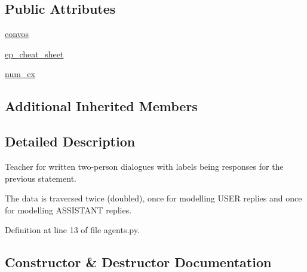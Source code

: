 \subsection*{Public Attributes}
\begin{DoxyCompactItemize}
\item 
\hyperlink{classparlai_1_1tasks_1_1taskmaster_1_1agents_1_1SelfDialogueTeacher_a6a5215f1c64623de6962a32b95f27fac}{convos}
\item 
\hyperlink{classparlai_1_1tasks_1_1taskmaster_1_1agents_1_1SelfDialogueTeacher_ac8110082f9ce0736ff129f93cf7740c1}{ep\+\_\+cheat\+\_\+sheet}
\item 
\hyperlink{classparlai_1_1tasks_1_1taskmaster_1_1agents_1_1SelfDialogueTeacher_a8a3fced952427353aba96b59a8efe0d2}{num\+\_\+ex}
\end{DoxyCompactItemize}
\subsection*{Additional Inherited Members}


\subsection{Detailed Description}
\begin{DoxyVerb}Teacher for written two-person dialogues with labels being responses for the
previous statement.

The data is traversed twice (doubled), once for modelling USER replies and once for
modelling ASSISTANT replies.
\end{DoxyVerb}
 

Definition at line 13 of file agents.\+py.



\subsection{Constructor \& Destructor Documentation}
\mbox{\label{classparlai_1_1tasks_1_1taskmaster_1_1agents_1_1SelfDialogueTeacher_a32491a46f580811d074f1a2566793fc4}} 
